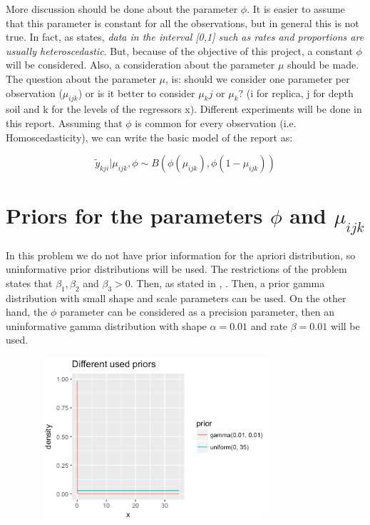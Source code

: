 \documentclass{article}
\begin{document}
More discussion should be done about the parameter $\phi$. It is easier to assume that this parameter is constant for all the observations, but in general this is not true. In fact, as \cite{cribari2009beta} states, \textit{data in the interval [0,1] such as rates and proportions are usually heteroscedastic}. But, because of the objective of this project, a constant $\phi$ will be considered. Also, a consideration about the parameter $\mu$ should be made. The question about the parameter $\mu$, is: should we consider one parameter per observation ($\mu_{ijk}$) or is it better to consider $\mu_kj$ or $\mu_k$? (i for replica, j for depth soil and k for the levels of the regressors x). Different experiments will be done in this report. Assuming that $\phi$ is common for every observation (i.e. Homoscedasticity), we can write the basic model of the report as:

\begin{equation}
\tilde{y}_{kji}| \mu_{ijk}, \phi \sim B(\phi(\mu_{ijk}), \phi(1-\mu_{ijk}))
\end{equation}


\section{Priors for the parameters $\phi$ and $\mu_{ijk}$}

In this problem we do not have prior information for the apriori distribution, so uninformative prior distributions will be used. The restrictions of the problem states that $\beta_1, \beta_2$ and $\beta_3 > 0$. Then, as stated in \cite{costa2017bayesian}, . Then, a prior gamma distribution with small shape and scale parameters can be used. On the other hand, the $\phi$ parameter can be considered as a precision parameter, then an uninformative gamma distribution with shape $\alpha = 0.01$ and rate $\beta = 0.01$ will be used.

\begin{figure}[ht!]
\centering
\includegraphics[width=9cm, height = 6cm]{p2.png}
\end{figure}
\end{document}

